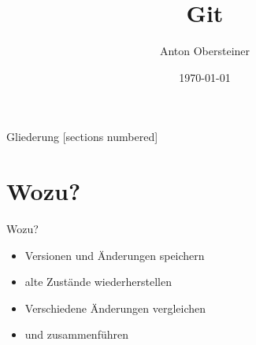 



\title{Git}
\author{Anton Obersteiner}
\date{\today}

\usepackage{tikz}
\usepackage{chemarrow}
\def\Ra[#1]#2{++(0, .2) arc [start angle=110, end angle= 70, radius=#1] node[near start, above] {#2}}
\def\Rb[#1]#2{++(0,-.2) arc [start angle=-70, end angle=-110, radius=#1] node[near start, below] {#2}}
\newcommand\pic{\begin{tikzpicture}
	\node (working) at (0, 0) {working};
	\node (stage) at (2, 0) {stage};
	\node (repo) at (4, 0) {repo};
	\node (remote) at (6, 0) {remote};

	\draw[-latex] (working) -- node[above] {\tt add} (stage);
	\draw[-latex] (stage) \Ra[3cm]{\tt commit} (repo);
	\draw[-latex] (repo) \Rb[6cm]{\tt checkout} (working);
	\draw[-latex] (repo) \Ra[3cm]{\tt push} (remote);
	\draw[-latex] (remote) \Rb[3cm]{\tt pull} (repo);
\end{tikzpicture}}



\maketitle

\begin{frame}{Gliederung}
	[sections numbered]
	\tableofcontents
\end{frame}

\section{Wozu?}
\begin{frame}{Wozu?}
	\begin{itemize}
		\item Versionen und Änderungen speichern
		\item alte Zustände wiederherstellen
		\item Verschiedene Änderungen vergleichen
		\item und zusammenführen
	\end{itemize}
\end{frame}

